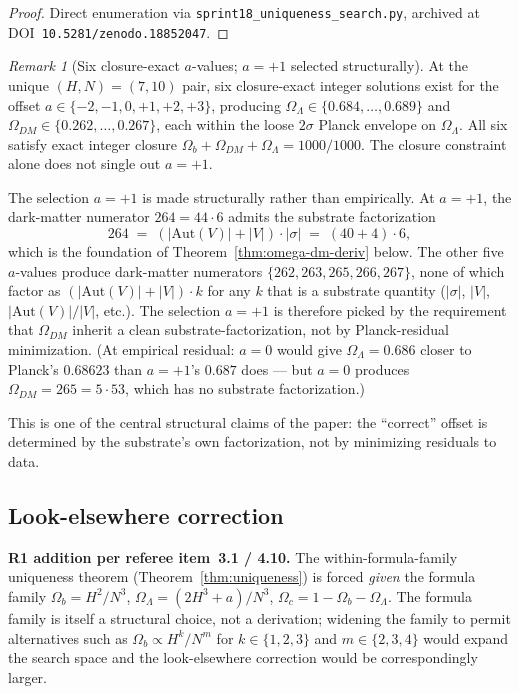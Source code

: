 \documentclass[11pt,reqno]{amsart}
\theoremstyle{plain}
\theoremstyle{definition}
\theoremstyle{remark}
\newtheorem*{remark}{Remark}
\newcommand{\Aut}{\mathrm{Aut}}
\begin{document}
\begin{proof}
Direct enumeration via \texttt{sprint18\_uniqueness\_search.py},
archived at DOI~\texttt{10.5281/zenodo.18852047}.
\end{proof}

\begin{remark}[Six closure-exact $a$-values; $a = +1$ selected structurally]\label{rem:a-selection}
At the unique $(H, N) = (7, 10)$ pair, six closure-exact integer
solutions exist for the offset $a \in \{-2, -1, 0, +1, +2, +3\}$,
producing $\Omega_\Lambda \in \{0.684, \ldots, 0.689\}$ and
$\Omega_{DM} \in \{0.262, \ldots, 0.267\}$, each within the loose
$2\sigma$ Planck envelope on $\Omega_\Lambda$. All six satisfy
exact integer closure $\Omega_b + \Omega_{DM} + \Omega_\Lambda = 1000/1000$.
The closure constraint alone does not single out $a = +1$.

The selection $a = +1$ is made structurally rather than empirically.
At $a = +1$, the dark-matter numerator $264 = 44 \cdot 6$ admits the
substrate factorization
\[
  264 \;=\; (|\Aut(V)| + |V|) \cdot |\sigma| \;=\; (40 + 4) \cdot 6,
\]
which is the foundation of Theorem~\ref{thm:omega-dm-deriv} below.
The other five $a$-values produce dark-matter numerators
$\{262, 263, 265, 266, 267\}$, none of which factor as
$(|\Aut(V)| + |V|) \cdot k$ for any $k$ that is a substrate
quantity ($|\sigma|$, $|V|$, $|\Aut(V)|/|V|$, etc.). The
selection $a = +1$ is therefore picked by the requirement that
$\Omega_{DM}$ inherit a clean substrate-factorization, not by
Planck-residual minimization. (At empirical residual:
$a = 0$ would give $\Omega_\Lambda = 0.686$ closer to Planck's
$0.68623$ than $a = +1$'s $0.687$ does --- but $a = 0$ produces
$\Omega_{DM} = 265 = 5 \cdot 53$, which has no substrate
factorization.)

This is one of the central structural claims of the paper: the
``correct'' offset is determined by the substrate's own
factorization, not by minimizing residuals to data.
\end{remark}

\subsection{Look-elsewhere correction}\label{sec:lookelsewhere}

\textbf{R1 addition per referee item~3.1 / 4.10.} The
within-formula-family uniqueness theorem
(Theorem~\ref{thm:uniqueness}) is forced \emph{given} the formula
family $\Omega_b = H^2/N^3$, $\Omega_\Lambda = (2H^3 + a)/N^3$,
$\Omega_c = 1 - \Omega_b - \Omega_\Lambda$. The formula family is
itself a structural choice, not a derivation; widening the family
to permit alternatives such as $\Omega_b \propto H^k/N^m$ for
$k \in \{1, 2, 3\}$ and $m \in \{2, 3, 4\}$ would expand the
search space and the look-elsewhere correction would be
correspondingly larger.
\end{document}
